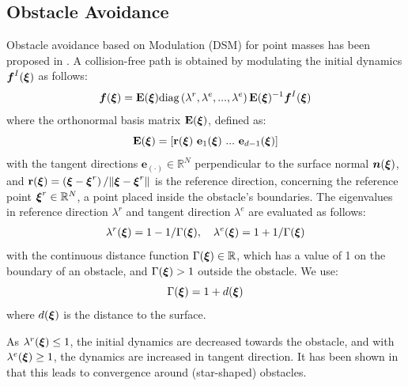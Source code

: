 \documentclass[conference]{IEEEtran}
\begin{document}
\subsection{Obstacle Avoidance}
Obstacle avoidance based on Modulation (DSM) for point masses has been proposed in \cite{huber2022avoiding}. A collision-free path is obtained by modulating the initial dynamics $\boldsymbol{f}^I(\boldsymbol{\xi})$ as follows:
\begin{equation}
  \vecs f(\vecs \xi) = \textbf{E}(\vecs \xi) \text{diag} \left(\lambda^r, \lambda^e, ..., \lambda^e \right) \textbf{E}(\vecs{\xi})^{-1} \vect f^I(\vecs \xi)
  \label{eq:modulated} 
\end{equation}
where the orthonormal basis matrix $\textbf{E}(\boldsymbol{\xi})$, defined as:
\begin{equation}
\textbf{E}(\vecs \xi) = \left[ \textbf{r}(\vecs \xi) \ \textbf{e}_1(\vecs \xi) \ ... \ \textbf{e}_{d-1}(\vecs \xi) \right]
\label{eq:matrix_E}
\end{equation}
with the tangent directions $\textbf{e}_{(\cdot)} \in \mathbb{R}^N$ perpendicular to the surface normal $\boldsymbol{n}(\boldsymbol{\xi})$, and $\textbf{r}(\boldsymbol{\xi}) =  \left( \boldsymbol{\xi}-\boldsymbol{\xi}^r \right) / \| \boldsymbol{\xi}-\boldsymbol{\xi} ^r \|$ is the reference direction, concerning the reference point $\boldsymbol{\xi}^r \in \mathbb{R}^N$, a point placed inside the obstacle's boundaries.
The eigenvalues in reference direction  $\lambda^r$ and tangent direction $\lambda^e$ are evaluated as follows:
\begin{equation}
\begin{split}
    \lambda^r(\vecs \xi) = 1 - 1 /\Gamma(\vecs \xi) , \quad \lambda^e(\vecs \xi) = 1 + 1 / \Gamma(\vecs \xi)
    \label{eq:eigenvalues}
    \end{split}
\end{equation}
with the continuous distance function $\Gamma(\boldsymbol{\xi}) \in \mathbb{R}$, which has a value of 1 on the boundary of an obstacle, and $\Gamma(\boldsymbol{\xi}) > 1$ outside the obstacle. We use:
\begin{equation}
  \Gamma(\boldsymbol{\xi}) = 1 + d (\boldsymbol{\xi})
\end{equation}
where $d (\boldsymbol{\xi})$ is the distance to the surface.

As $\lambda^r(\boldsymbol{\xi}) \leq 1$, the initial dynamics are decreased towards the obstacle, and with $\lambda^e(\boldsymbol{\xi}) \geq 1$, the dynamics are increased in tangent direction. It has been shown in \cite{huber2022avoiding} that this leads to convergence around (star-shaped) obstacles.
\end{document}
